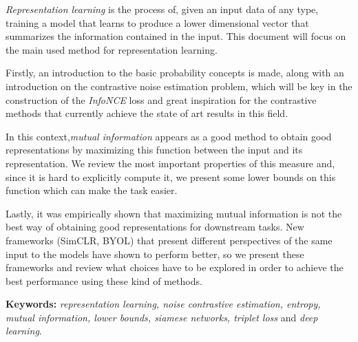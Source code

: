 \emph{Representation learning} is the process of, given an input data of any type, training a model that learns to produce a lower dimensional vector that summarizes the information contained in the input. This document will focus on the main used method for representation learning.

Firstly, an introduction to the basic probability concepts is made, along with an introduction on the contrastive noise estimation problem, which will be key in the construction of the \emph{InfoNCE} loss and great inspiration for the contrastive methods that currently achieve the state of art results in this field.

In this context,\emph{mutual information} appears as a good method to obtain good representations by maximizing this function between the input and its representation. We review the most important properties of this measure and, since it is hard to explicitly compute it, we present some lower bounds on this function which can make the task easier.

Lastly, it was empirically shown that maximizing mutual information is not the best way of obtaining good representations for downstream tasks. New frameworks (SimCLR, BYOL) that present different perspectives of the same input to the models have shown to perform better, so we present these frameworks and review what choices have to be explored in order to achieve the best performance using these kind of methods.




\textbf{Keywords:} \emph{representation learning, noise contrastive estimation, entropy, mutual information, lower bounds, siamese networks, triplet loss} and \emph{deep learning}.